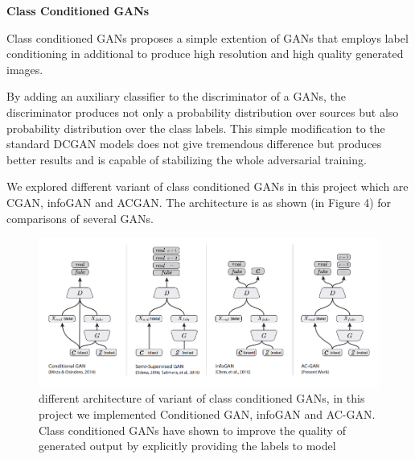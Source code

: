 \documentclass{article}
\begin{document}
\medskip

\medskip
\begin{center}
    {\Large{\textbf{Class Conditioned GANs}}}
\end{center}
Class conditioned GANs proposes a simple extention of GANs that employs label conditioning in additional to produce high resolution and high quality generated images.

By adding an auxiliary classifier to the discriminator of a GANs, the discriminator produces not only a probability distribution over sources but also probability distribution over the class labels. This simple modification to the standard DCGAN models does not give tremendous difference but produces better results and is capable of stabilizing the whole adversarial training.

We explored different variant of class conditioned GANs in this project which are CGAN, infoGAN and ACGAN.
The architecture is as shown (in Figure 4) for comparisons of several GANs.

\begin{figure}[h]
    \centering
    \includegraphics[width=1\textwidth]{images/class_conditional_gan.png}
    \caption{different architecture of variant of class conditioned GANs, in this project we implemented Conditioned GAN, infoGAN and AC-GAN. Class conditioned GANs have shown to improve the quality of generated output by explicitly providing the labels to model}
    \label{fig:mesh1}
\end{figure}
\medskip

\medskip
\end{document}
